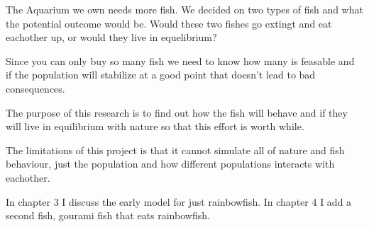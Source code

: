\begin{flushleft}
    The Aquarium we own needs more fish. We decided on
    two types of fish and what the potential outcome would be. Would these
    two fishes go extingt and eat eachother up, or would they live in equelibrium?

\end{flushleft}

\begin{flushleft}
    Since you can only buy so many fish we need to know how many is feasable
    and if the population will stabilize at a good point that doesn't
    lead to bad consequences.

\end{flushleft}

\begin{flushleft}
    The purpose of this research is to find out how the fish will behave
    and if they will live in equilibrium with nature so that this effort
    is worth while.
\end{flushleft}

\begin{flushleft}
    The limitations of this project is that it cannot simulate all of nature
    and fish behaviour, just the population and how different populations
    interacts with eachother.
\end{flushleft}

\begin{flushleft}
    In chapter 3 I discuss the early model for just rainbowfish. In
    chapter 4 I add a second fish, gourami fish that eats rainbowfish.
\end{flushleft}